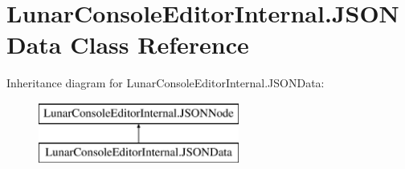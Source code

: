 \hypertarget{class_lunar_console_editor_internal_1_1_j_s_o_n_data}{}\section{Lunar\+Console\+Editor\+Internal.\+J\+S\+O\+N\+Data Class Reference}
\label{class_lunar_console_editor_internal_1_1_j_s_o_n_data}
Inheritance diagram for Lunar\+Console\+Editor\+Internal.\+J\+S\+O\+N\+Data\+:\begin{figure}[H]
\begin{center}
\leavevmode
\includegraphics[height=2.000000cm]{class_lunar_console_editor_internal_1_1_j_s_o_n_data}
\end{center}
\end{figure}

